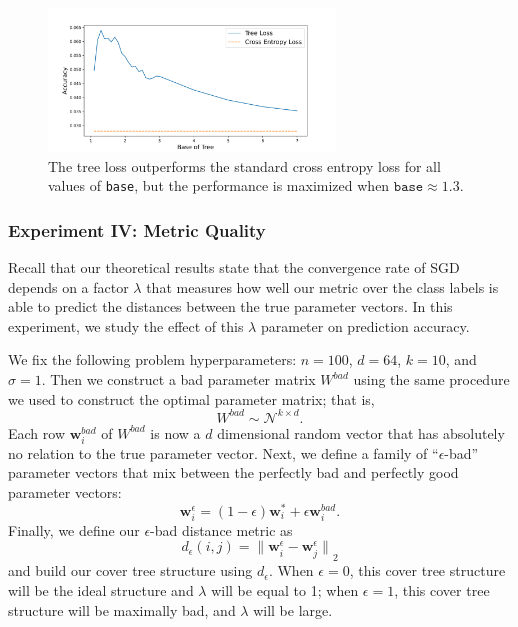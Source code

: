 \documentclass[twoside]{article}
\newcommand{\bad}[1]{{#1}^{\textit{bad}}}
\newcommand{\w}{\mathbf w}
\newcommand{\ltwo}[1]{{\lVert {#1} \rVert}_2}
\begin{document}
\begin{figure}
    \includegraphics[width=\columnwidth,height=1.5in]{fig/new_img/accuracy_vs_base.png}
            \caption
            {The tree loss outperforms the standard cross entropy loss for all values of \texttt{base}, but the performance is maximized when $\texttt{base}\approx1.3$.}
            \label{fig:ct:acc}
\end{figure}



\subsubsection{Experiment IV: Metric Quality}
\label{sec:synth:eps}

Recall that our theoretical results state that the convergence rate of SGD depends on a factor $\lambda$ that measures how well our metric over the class labels is able to predict the distances between the true parameter vectors.
In this experiment, we study the effect of this $\lambda$ parameter on prediction accuracy.

We fix the following problem hyperparameters:
$n=100$, $d=64$, $k=10$, and $\sigma=1$.
Then we construct a bad parameter matrix $\bad W$ using the same procedure we used to construct the optimal parameter matrix;
that is,
\begin{equation}
    \bad W \sim \mathcal N ^ {k\times d}
    .
\end{equation}
Each row $\bad \w_i$ of $\bad W$ is now a $d$ dimensional random vector that has absolutely no relation to the true parameter vector.
Next, we define a family of ``$\epsilon$-bad'' parameter vectors that mix between the perfectly bad and perfectly good parameter vectors:
\begin{equation}
    \w^\epsilon_i = (1-\epsilon) \w^*_i + \epsilon \bad\w_i.
\end{equation}
Finally, we define our $\epsilon$-bad distance metric as
\begin{equation}
    d_\epsilon(i,j) = \ltwo{\w_i^\epsilon - \w_j^\epsilon}
\end{equation}
and build our cover tree structure using $d_\epsilon$.
When $\epsilon=0$, this cover tree structure will be the ideal structure and $\lambda$ will be equal to 1;
when $\epsilon=1$, this cover tree structure will be maximally bad, and $\lambda$ will be large.
\end{document}
